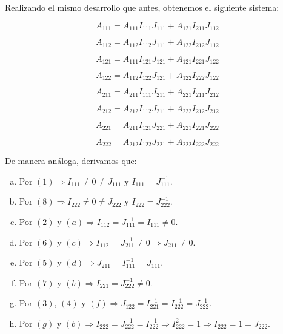 \documentclass[a4paper, titlepage]{article}
\begin{document}
Realizando el mismo desarrollo que antes, obtenemos el siguiente sistema:

\begin{equation}
A_{111} = A_{111} I_{111} J_{111} + A_{121} I_{211} J_{112}
\end{equation}

\begin{equation}
A_{112} = A_{112} I_{112} J_{111} + A_{122} I_{212} J_{112}
\end{equation}

\begin{equation}
A_{121} = A_{111} I_{121} J_{121} + A_{121} I_{221} J_{122}
\end{equation}

\begin{equation}
A_{122} = A_{112} I_{122} J_{121} + A_{122} I_{222} J_{122}
\end{equation}

\begin{equation}
A_{211} = A_{211} I_{111} J_{211} + A_{221} I_{211} J_{212}
\end{equation}

\begin{equation}
A_{212} = A_{212} I_{112} J_{211} + A_{222} I_{212} J_{212}
\end{equation}

\begin{equation}
A_{221} = A_{211} I_{121} J_{221} + A_{221} I_{221} J_{222}
\end{equation}

\begin{equation}
A_{222} = A_{212} I_{122} J_{221} + A_{222} I_{222} J_{222}
\end{equation}

De manera análoga, derivamos que:

\begin{enumerate}[(a)]
	\item Por $(1) \Rightarrow I_{111} \neq 0 \neq J_{111}$ y $I_{111} = J_{111}^{-1}$.
	\item Por $(8) \Rightarrow I_{222} \neq 0 \neq J_{222}$ y $I_{222} = J_{222}^{-1}$.
	\item Por $(2)$ y $(a) \Rightarrow I_{112} = J_{111}^{-1} = I_{111} \neq 0$.
	\item Por $(6)$ y $(c) \Rightarrow I_{112} = J_{211}^{-1} \neq 0 \Rightarrow J_{211} \neq 0$.
	\item Por $(5)$ y $(d) \Rightarrow J_{211} = I_{111}^{-1} = J_{111}$.
	\item Por $(7)$ y $(b) \Rightarrow I_{221} = J_{222}^{-1} \neq 0$.
	\item Por $(3)$, $(4)$ y $(f) \Rightarrow J_{122} = I_{221}^{-1} = I_{222}^{-1} = J_{222}^{-1}$.
	\item Por $(g)$ y $(b) \Rightarrow I_{222} = J_{222}^{-1} = I_{222}^{-1} \Rightarrow I_{222}^2 = 1 \Rightarrow I_{222} = 1 = J_{222}$.
\end{enumerate}
\end{document}
